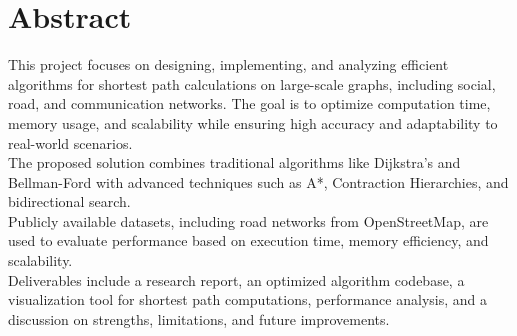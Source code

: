 \vspace{2in}
\chapter*{Abstract}


This project focuses on designing, implementing, and analyzing efficient algorithms for shortest path calculations on large-scale graphs, including social, road, and communication networks. The goal is to optimize computation time, memory usage, and scalability while ensuring high accuracy and adaptability to real-world scenarios. \\

The proposed solution combines traditional algorithms like Dijkstra’s and Bellman-Ford with advanced techniques such as A*, Contraction Hierarchies, and bidirectional search. \\

Publicly available datasets, including road networks from OpenStreetMap, are used to evaluate performance based on execution time, memory efficiency, and scalability. \\

Deliverables include a research report, an optimized algorithm codebase, a visualization tool for shortest path computations, performance analysis, and a discussion on strengths, limitations, and future improvements.
